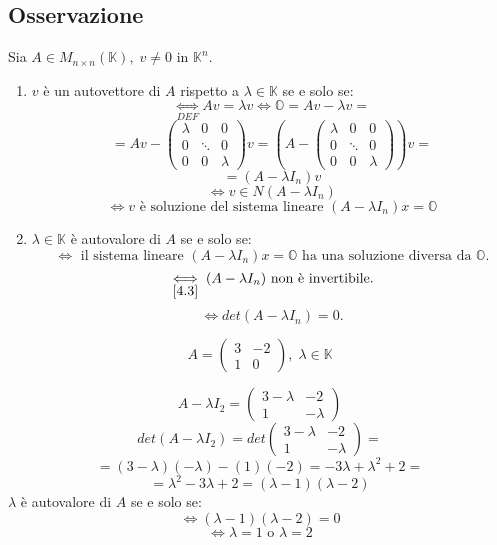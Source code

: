 \documentclass[a4paper]{article}
\theoremstyle{break}
\theoremstyle{break}
\theoremstyle{break}
\theoremstyle{break}
\begin{document}
\subsection{Osservazione}
Sia \( A \in M_{n \times n}(\mathbb{K}),\; v \neq 0 \) in \( \mathbb{K}^n \).
\begin{enumerate}
  \item \( v \) è un autovettore di \( A \) rispetto a \( \lambda \in \mathbb{K} \) se
    e solo se:
    \[
      \underset{DEF}{\iff} Av = \lambda v \iff \mathbb{O} = Av - \lambda v =
    \] 
    \[
     = Av - \begin{pmatrix} 
       \lambda & 0 & 0\\
       0 & \ddots & 0\\
       0 & 0 & \lambda
     \end{pmatrix} 
     v
     =
     \left( A - \begin{pmatrix} 
       \lambda & 0 & 0\\
       0 & \ddots & 0\\
       0 & 0 & \lambda
     \end{pmatrix}  \right) v
     =
    \] 
    \[
    = \left( A - \lambda I_n \right) v
    \] 
    \[
    \iff v \in N(A - \lambda I_n)
    \] 
    \[
    \iff v \text{ è soluzione del sistema lineare } (A - \lambda I_n)x = \mathbb{O}
    \] 

  \item \( \lambda \in  \mathbb{K} \) è autovalore di \( A \) se e solo se:
    \[
    \iff \text{ il sistema lineare } (A - \lambda I_n)x = \mathbb{O} \text{ ha una
      soluzione diversa da } \mathbb{O}.
    \] 
    \[
      \underset{\ref{4.3}}{\iff} (A - \lambda I_n) \text{ non è invertibile.}
    \] 
    \[
    \iff det(A - \lambda I_n) = 0.
    \] 
\end{enumerate}

\begin{example}
  \[
  A = \begin{pmatrix} 
    3 & -2\\
    1 & 0
  \end{pmatrix} 
  ,\; \lambda \in \mathbb{K}
  \] 

  \[
  A - \lambda I_2 = \begin{pmatrix} 
    3-\lambda & -2\\
    1 & -\lambda
  \end{pmatrix}
  \] 
  \vspace{1em}
  \[
  det(A - \lambda I_2) = det \begin{pmatrix} 
    3-\lambda & -2\\
    1 & -\lambda
  \end{pmatrix}
  =
  \] 
  \[
  = (3 - \lambda)(-\lambda) - (1)(-2) = -3 \lambda + \lambda^2 + 2 =
  \] 
  \[
  = \lambda^2 - 3 \lambda + 2 = (\lambda - 1)(\lambda - 2)
  \] 
  \( \lambda \) è autovalore di \( A \) se e solo se:
  \[
  \iff (\lambda - 1)(\lambda - 2) = 0
  \] 
  \[
  \iff \lambda = 1 \text{ o } \lambda = 2
  \] 
\end{example}
\end{document}
